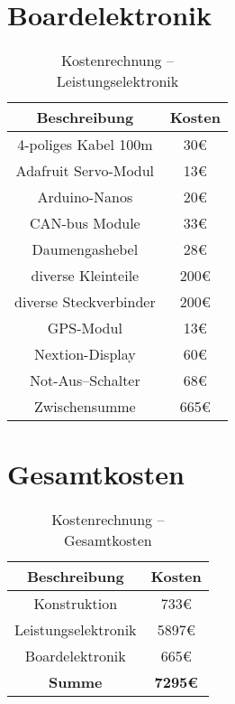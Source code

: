 \section{Boardelektronik}
\begin{table}[H]
    \centering
    \begin{tabular}{|c|c|}
        \hline
        \textbf{Beschreibung} & \textbf{Kosten}\\\hline
        4-poliges Kabel 100m & 30\euro\\
        Adafruit Servo-Modul & 13\euro\\
        Arduino-Nanos & 20\euro\\
        CAN-bus Module & 33\euro\\
        Daumengashebel & 28\euro\\
        diverse Kleinteile & 200\euro\\
        diverse Steckverbinder & 200\euro\\
        GPS-Modul & 13\euro\\
        Nextion-Display & 60\euro\\
        Not-Aus--Schalter & 68\euro\\        
        \hline
        Zwischensumme & 665\euro\\\hline
    \end{tabular}
    \caption{Kostenrechnung -- Leistungselektronik}
\end{table}

\section{Gesamtkosten}
\begin{table}[H]
    \centering
    \begin{tabular}{|c|c|}
        \hline
        \textbf{Beschreibung} & \textbf{Kosten}\\\hline
        Konstruktion & 733\euro\\
        Leistungselektronik & 5897\euro\\
        Boardelektronik & 665\euro\\
        \hline
        \textbf{Summe} & \textbf{7295\euro}\\\hline
    \end{tabular}
    \caption{Kostenrechnung -- Gesamtkosten}
\end{table}
